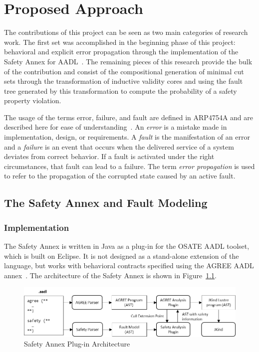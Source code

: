 \chapter{Proposed Approach}
\label{ch:prop}

The contributions of this project can be seen as two main categories of research work. The first set was accomplished in the beginning phase of this project: behavioral and explicit error propagation through the implementation of the Safety Annex for AADL~\cite{Stewart17:IMBSA,stewart2020safety}. The remaining pieces of this research provide the bulk of the contribution and consist of the compositional generation of minimal cut sets through the transformation of inductive validity cores and using the fault tree generated by this transformation to compute the probability of a safety property violation. 

The usage of the terms error, failure, and fault are defined in ARP4754A and are described here for ease of understanding~\cite{SAE:ARP4754A}. An \textit{error} is a mistake made in implementation, design, or requirements. A \textit{fault} is the manifestation of an error and a \textit{failure} is an event that occurs when the delivered service of a system deviates from correct behavior. If a fault is activated under the right circumstances, that fault can lead to a failure. The term \textit{error propagation} is used to refer to the propagation of the corrupted state caused by an active fault.

\section{The Safety Annex and Fault Modeling}
\subsection{Implementation}
The Safety Annex is written in Java as a plug-in for the OSATE AADL toolset, which is built on Eclipse.  It is not designed as a stand-alone extension of the language, but works with behavioral contracts specified using the AGREE AADL annex~\cite{NFM2012:CoGaMiWhLaLu}. 
The architecture of the Safety Annex is shown in Figure~\ref{fig:plugin-arch}.

\begin{figure}[h!]
	\begin{center}
		\includegraphics[width=\textwidth]{images/arch.png}
	\end{center}
	\caption{Safety Annex Plug-in Architecture}
	\label{fig:plugin-arch}
\end{figure}


